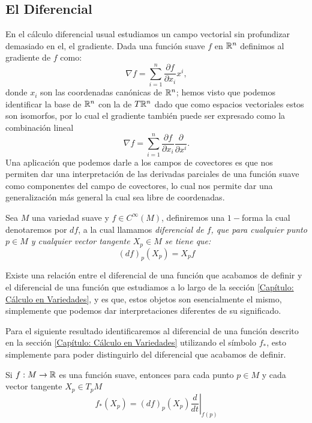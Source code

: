 \subsection{El Diferencial}\label{Subsección: El Diferencial}
En el cálculo diferencial usual estudiamos un campo vectorial sin profundizar demasiado en el, el gradiente. Dada una función suave $f$ en $\mathbb{R}^n$ definimos al gradiente de $f$ como:
\[
	\nabla f = \sum_{i=1}^{n} \frac{\partial f}{\partial x_i} x^i,
\]
donde $x_i$ son las coordenadas canónicas de $\mathbb{R}^n$; hemos visto que podemos identificar la base de $\mathbb{R}^n$ con la de $T\mathbb{R}^n$ dado que como espacios vectoriales estos son isomorfos, por lo cual el gradiente también puede ser expresado como la combinación lineal
\[
	\nabla f = \sum_{i=1}^{n} \frac{\partial f}{\partial x_i} \frac{\partial}{\partial x^i}.
\]
Una aplicación que podemos darle a los campos de covectores es que nos permiten dar una interpretación de las derivadas parciales de una función suave como componentes del campo de covectores, lo cual nos permite dar una generalización más general la cual sea libre de coordenadas.

\begin{definition}
	Sea $M$ una variedad suave y $f \in C^{\infty}(M)$, definiremos una $1-$forma la cual denotaremos por $df$, a la cual llamamos \it{diferencial de $f$}, que para cualquier punto $p \in M$ y cualquier vector tangente $X_p \in M$ se tiene que:
	\[
		(df)_p(X_p) = X_p f
	\]
\end{definition}

Existe una relación entre el diferencial de una función que acabamos de definir y el diferencial de una función que estudiamos a lo largo de la sección \ref{Capítulo: Cálculo en Variedades}, y es que, estos objetos son esencialmente el mismo, simplemente que podemos dar interpretaciones diferentes de su significado.

Para el siguiente resultado identificaremos al diferencial de una función descrito en la sección \ref{Capítulo: Cálculo en Variedades} utilizando el símbolo $f_*$, esto simplemente para poder distinguirlo del diferencial que acabamos de definir.

\begin{theorem}
	Si $f: M \to \mathbb{R}$ es una función suave, entonces para cada punto $p \in M$ y cada vector tangente $X_p \in T_pM$
	\[
		f_*(X_p) = (df)_p (X_p) \left. \frac{d}{dt} \right|_{f(p)}
	\]
\end{theorem}

